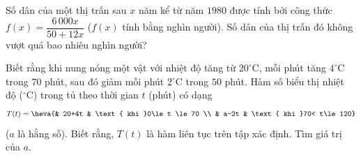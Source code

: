 \begin{ex}%
	Số dân của một  thị trấn sau $x$ năm kể từ năm $1980$ được tính bởi công thức $f(x)=\dfrac{6\,000x}{50+12x}$ ($f(x)$ tính bằng nghìn người). Số dân của thị trấn đó không vượt quá bao nhiêu nghìn người?
\end{ex}

\begin{ex}%
	Biết rằng khi nung nóng một vật với nhiệt độ tăng từ $20^\circ$C, mỗi phút tăng $4^\circ$C trong $70$ phút, sau đó giảm mỗi phút $2^\circ$C trong $50$ phút. Hàm số biểu thị nhiệt độ ($^\circ$C) trong tủ theo thời gian $t$ (phút) có dạng 
	$$T(t)=\heva{&  20+4t & \text{ khi }0\le t \le 70 \\ & a-2t & \text{ khi }70< t\le 120}$$
	($a$ là hằng số). Biết rằng, $T(t)$ là hàm liên tục trên tập xác định. Tìm giá  trị của $a$.
\end{ex}

